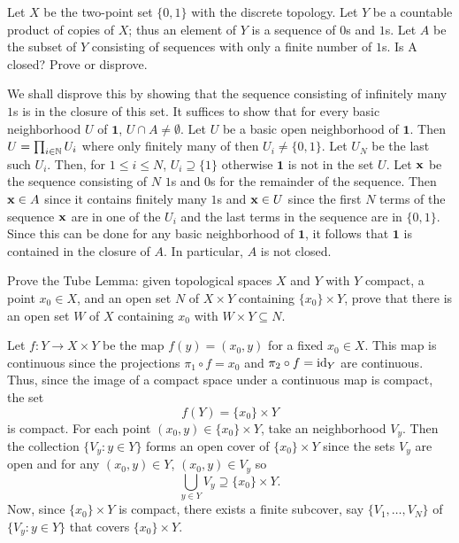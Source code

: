 \begin{problem}
  Let \(X\) be the two-point set \(\{0,1\}\) with the discrete
  topology. Let \(Y\) be a countable product of copies of \(X\); thus an
  element of \(Y\) is a sequence of \(0\)s and \(1\)s.  Let \(A\) be the
  subset of \(Y\) consisting of sequences with only a finite number of
  \(1\)s. Is A closed?  Prove or disprove.
\end{problem}
\begin{solution}
  We shall disprove this by showing that the sequence consisting of
  infinitely many \(1\)s is in the closure of this set. It suffices to show
  that for every basic neighborhood \(U\) of \(\mathbf{1}\),
  \(U\cap A\neq\emptyset\). Let \(U\) be a basic open neighborhood of
  \(\mathbf{1}\). Then \(U=\prod_{i\in\mathbb{N}} U_i\) where only finitely many
  of then \(U_i\neq \{0,1\}\). Let \(U_N\) be the last such \(U_i\). Then,
  for \(1\leq i\leq N\), \(U_i\supseteq\{1\}\) otherwise \(\mathbf{1}\) is
  not in the set \(U\). Let \(\mathbf{x}\) be the sequence consisting of \(N\)
  \(1\)s and \(0\)s for the remainder of the sequence. Then \(\mathbf{x}\in A\)
  since it contains finitely many \(1\)s and \(\mathbf{x}\in U\) since the first
  \(N\) terms of the sequence \(\mathbf{x}\) are in one of the \(U_i\) and the
  last terms in the sequence are in \(\{0,1\}\). Since this can be done for
  any basic neighborhood of \(\mathbf{1}\), it follows that \(\mathbf{1}\)
  is contained in the closure of \(A\). In particular, \(A\) is not
  closed.
\end{solution}

\begin{problem}
  Prove the Tube Lemma: given topological spaces \(X\) and \(Y\) with \(Y\)
  compact, a point \(x_0\in X\), and an open set \(N\) of \(X\times Y\)
  containing \(\{x_0\}\times Y\), prove that there is an open set \(W\) of
  \(X\) containing \(x_0\) with \(W\times Y\subseteq N\).
\end{problem}
\begin{solution}
  Let \(f\colon Y\to X\times Y\) be the map \(f(y)=(x_0,y)\) for a fixed
  \(x_0\in X\). This map is continuous since the projections
  \(\pi_1\circ f=x_0\) and \(\pi_2\circ f=\operatorname{id}_Y\) are continuous. Thus,
  since the image of a compact space under a continuous map is compact, the
  set
  \[
    f(Y)=\{x_0\}\times Y
  \]
  is compact. For each point \((x_0,y)\in \{x_0\}\times Y\), take an
  neighborhood \(V_y\). Then the collection \(\{V_y:y\in Y\}\) forms an
  open cover of \(\{x_0\}\times Y\) since the sets \(V_y\) are open and for
  any \((x_0,y)\in Y\), \((x_0,y)\in V_y\) so
  \[
    \bigcup_{y\in Y}V_y\supseteq \{x_0\}\times Y.
  \]
  Now, since \(\{x_0\}\times Y\) is compact, there exists a finite
  subcover, say \(\{V_1,\dotsc,V_N\}\) of \(\{V_y:y\in Y\}\) that covers
  \(\{x_0\}\times Y\).
\end{solution}

